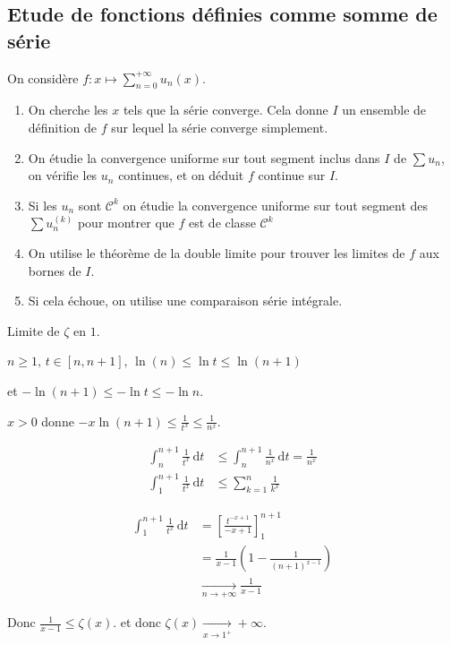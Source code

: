 \subsection{Etude de fonctions définies comme somme de série }


On considère $f : \displaystyle x \mapsto \sum_{n = 0}^{+ \infty} u_n(x)$. 

\begin{enumerate}
    \item On cherche les $x$ tels que la série converge. Cela donne $I$ un ensemble de définition 
    de $f$ sur lequel la série converge simplement.
    \item On étudie la convergence uniforme sur tout segment inclus dans $I$ de $\sum u_n$, on vérifie 
    les $u_n$ continues, et on déduit $f$ continue sur $I$.
    \item Si les $u_n$ sont $\mathscr C^k$ on étudie la convergence uniforme sur tout segment des 
    $\sum u_n^{(k)}$ pour montrer que $f$ est de classe $\mathscr{C}^k$ 
    \item On utilise le théorème de la double limite pour trouver les limites de $f$ aux bornes 
    de $I$. 
    \item Si cela échoue, on utilise une comparaison série intégrale. 
\end{enumerate}

\begin{exemple}
    Limite de $\zeta$ en $1$.

    $n \geqslant 1, \, t \in [n, n+ 1], \, \ln(n) \leqslant \ln t \leqslant \ln (n+ 1)$
    
    et $-\ln(n + 1) \leqslant - \ln t \leqslant - \ln n$.

    $x > 0$ donne $- x \ln(n + 1) \leqslant \frac 1 {t^x} \leqslant \frac 1 {n^x}$.

    \begin{align}
        \int_n^{n + 1} \frac 1 {t^x} \,\mathrm{d}t & \leqslant \int_n^{n + 1} \frac 1 {n^x} \,\mathrm{d}t = \frac 1 {n^x} \\
        \int_1^{n + 1} \frac 1 {t^x} \, \mathrm{d}t & \leqslant \sum_{k = 1 }^{n } \frac 1 {k^x} 
    \end{align}

    \begin{align}
        \int_{1 }^{n + 1 } \frac 1 {t^x} \, \mathrm{d}t &  = \left[ \frac{t^{- x + 1}}{- x + 1} \right]_{1}^{n + 1} \\
        & = \frac{1 }{x - 1} \left( 1 - \frac 1 {(n + 1)^{x - 1}} \right)\\
        & \xrightarrow[n \to + \infty]{} \frac 1 {x - 1}
    \end{align} 

    Donc $\frac 1 {x - 1} \leqslant \zeta(x)$. et donc $\zeta(x) \xrightarrow[x \to 1^+]{} + \infty$.
\end{exemple}

